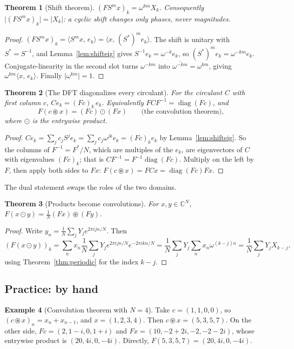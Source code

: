 \documentclass[11pt]{article}
\newtheorem{theorem}{Theorem}[section]
\theoremstyle{definition}
\newtheorem{example}[theorem]{Example}
\newcommand{\C}{\mathbb{C}}
\newcommand{\ip}[2]{\langle #1,\, #2\rangle}
\newcommand{\abs}[1]{\lvert #1\rvert}
\newcommand{\diag}{\operatorname{diag}}
\newcommand{\cconv}{\circledast}
\begin{document}
\begin{theorem}[Shift theorem]\label{thm:shift}
$(FS^mx)_k=\omega^{km}X_k$. Consequently $\abs{(FS^mx)_k}=\abs{X_k}$: a cyclic shift
changes only phases, never magnitudes.
\end{theorem}
\begin{proof}
$(FS^mx)_k=\ip{S^mx}{e_k}=\ip{x}{(S^*)^me_k}$. The shift is unitary with
$S^*=S^{-1}$, and Lemma~\ref{lem:shifteig} gives $S^{-1}e_k=\omega^{-k}e_k$, so
$(S^*)^me_k=\omega^{-km}e_k$. Conjugate-linearity in the second slot turns
$\omega^{-km}$ into $\overline{\omega^{-km}}=\omega^{km}$, giving
$\omega^{km}\ip{x}{e_k}$. Finally $\abs{\omega^{km}}=1$.
\end{proof}

\begin{theorem}[The DFT diagonalizes every circulant]\label{thm:diag}
For the circulant $C$ with first column $c$, $Ce_k=(Fc)_k\,e_k$. Equivalently
$FCF^{-1}=\diag(Fc)$, and
\[
F(c\cconv x)=(Fc)\odot(Fx)\qquad\text{(the convolution theorem),}
\]
where $\odot$ is the entrywise product.
\end{theorem}
\begin{proof}
$Ce_k=\sum_jc_jS^je_k=\sum_jc_j\omega^{jk}e_k=(Fc)_ke_k$ by Lemma~\ref{lem:shifteig}.
So the columns of $F^{-1}=F^*/N$, which are multiples of the $e_k$, are eigenvectors
of $C$ with eigenvalues $(Fc)_k$; that is $CF^{-1}=F^{-1}\diag(Fc)$. Multiply on the
left by $F$, then apply both sides to $Fx$:
$F(c\cconv x)=FCx=\diag(Fc)Fx$.
\end{proof}

The dual statement swaps the roles of the two domains.

\begin{theorem}[Products become convolutions]\label{thm:dual}
For $x,y\in\C^N$, $F(x\odot y)=\frac1N(Fx)\cconv(Fy)$.
\end{theorem}
\begin{proof}
Write $y_n=\frac1N\sum_jY_je^{2\pi ijn/N}$. Then
\[
(F(x\odot y))_k=\sum_nx_n\frac1N\sum_jY_je^{2\pi ijn/N}e^{-2\pi ikn/N}
=\frac1N\sum_jY_j\sum_nx_n\omega^{(k-j)n}=\frac1N\sum_jY_jX_{k-j},
\]
using Theorem~\ref{thm:periodic} for the index $k-j$.
\end{proof}

\subsection{Practice: by hand}

\begin{example}[Convolution theorem with $N=4$]
Take $c=(1,1,0,0)$, so $(c\cconv x)_n=x_n+x_{n-1}$, and $x=(1,2,3,4)$. Then
$c\cconv x=(5,3,5,7)$. On the other side, $Fc=(2,1-i,0,1+i)$ and
$Fx=(10,-2+2i,-2,-2-2i)$, whose entrywise product is $(20,4i,0,-4i)$. Directly,
$F(5,3,5,7)=(20,4i,0,-4i)$.
\end{example}
\end{document}
